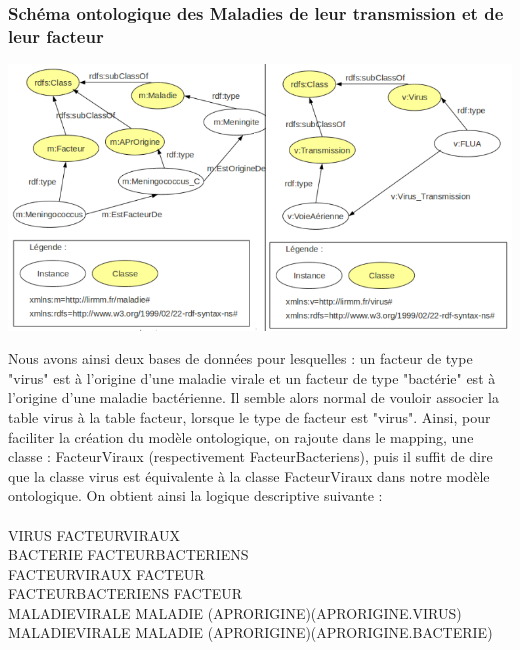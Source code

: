 \documentclass[12pt]{article}
\begin{document}
\subsubsection{Schéma ontologique des Maladies de leur transmission et de leur facteur}

\begin{center}
	\includegraphics[scale=0.60]{images/rdf-maladie+virus.png}
\end{center}

\indent Nous avons ainsi deux bases de données pour lesquelles : un facteur de type "virus" est à l'origine d'une maladie virale et un facteur de type "bactérie" est à l'origine d'une maladie bactérienne. Il semble alors normal de vouloir associer la table virus à la table facteur, lorsque le type de facteur est "virus". Ainsi, pour faciliter la création du modèle ontologique, on rajoute dans le mapping, une classe : FacteurViraux (respectivement FacteurBacteriens), puis il suffit de dire que la classe virus est équivalente à la classe FacteurViraux dans notre modèle ontologique. On obtient ainsi la logique descriptive suivante : 
\\
\\
	VIRUS \subseteq FACTEURVIRAUX \\
	BACTERIE \subseteq FACTEURBACTERIENS \\
	FACTEURVIRAUX \subseteq FACTEUR \\
	FACTEURBACTERIENS \subseteq FACTEUR \\ 
	MALADIEVIRALE \subseteq MALADIE \cap (\geq APRORIGINE)(\exists APRORIGINE.VIRUS) \\
 	MALADIEVIRALE \subseteq MALADIE \cap (\geq APRORIGINE)(\exists APRORIGINE.BACTERIE) \\
\end{document}
